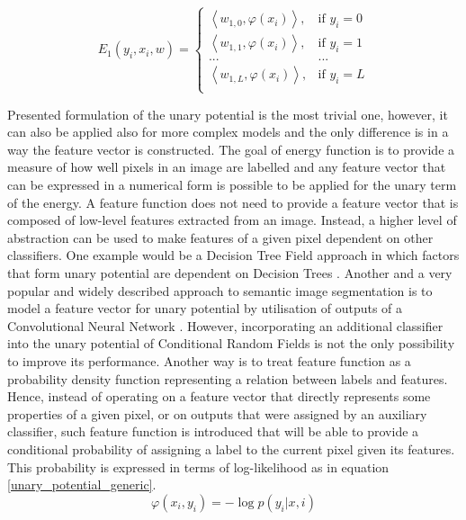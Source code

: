 \begin{equation}
    \label{eq:e1_weight_vector}
    E_1(y_i,x_i,w)= 
    \begin{cases}
        \left \langle w_{1,0}, \varphi({x_i}) \right \rangle , &  \text{if } y_i = 0\\ 
        \left \langle w_{1,1}, \varphi({x_i}) \right \rangle , & \text{if } y_i = 1\\
         ...& ...\\ 
        \left \langle w_{1,L}, \varphi({x_i}) \right \rangle , & \text{if } y_i = L\\  
    \end{cases}
\end{equation}


Presented formulation of the unary potential is the most trivial one, however, it can also be applied also for more complex models and the only difference is in a way the feature vector is constructed. The goal of energy function is to provide a measure of how well pixels in an image are labelled and any feature vector that can be expressed in a numerical form is possible to be applied for the unary term of the energy. A feature function does not need to provide a feature vector that is composed of low-level features extracted from an image. Instead, a higher level of abstraction can be used to make features of a given pixel dependent on other classifiers. One example would be a Decision Tree Field approach in which factors that form unary potential are dependent on Decision Trees \cite{crf_decision_trees}. Another and a very popular and widely described approach to semantic image segmentation is to model a feature vector for unary potential by utilisation of outputs of a Convolutional Neural Network \cite{inference_crf, crf_cnn1, crf_cnn2}. However, incorporating an additional classifier into the unary potential of Conditional Random Fields is not the only possibility to improve its performance. Another way is to treat feature function as a probability density function representing a relation between labels and features. Hence, instead of operating on a feature vector that directly represents some properties of a given pixel, or on outputs that were assigned by an auxiliary classifier, such feature function is introduced that will be able to provide a conditional probability of assigning a label to the current pixel given its features. This probability is expressed in terms of log-likelihood as in equation \ref{unary_potential_generic}.
\begin{equation}
    \label{unary_potential_generic}
    \varphi(x_i,y_i) = -\log p(y_i|x,i)
\end{equation}
